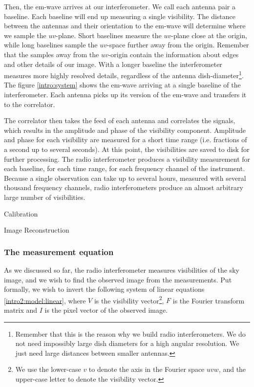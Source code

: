 Then, the em-wave arrives at our interferometer. We call each antenna pair a baseline. Each baseline will end up measuring a single visibility. The distance between the antennas and their orientation to the em-wave will determine where we sample the $uv$-plane. Short baselines measure the $uv$-plane close at the origin, while long baselines sample the $uv$-space further away from the origin. Remember that the samples away from the $uv$-origin contain the information about edges and other details of our image. With a longer baseline the interferometer measures more highly resolved details, regardless of the antenna dish-diameter\footnote{Remember that this is the reason why we build radio interferometers. We do not need impossibly large dish diameters for a high angular resolution. We just need large distances between smaller antennas.}. The figure \ref{intro:system} shows the em-wave arriving at a single baseline of the interferometer. Each antenna picks up its version of the em-wave and transfers it to the correlator.

The correlator then takes the feed of each antenna and correlates the signals, which results in the amplitude and phase of the visibility component. Amplitude and phase for each visibility are measured for a short time range (i.e. fractions of a second up to several seconds). At this point, the visibilities are saved to disk for further processing. The radio interferometer produces a visibility measurement for each baseline, for each time range, for each frequency channel of the instrument. Because a single observation can take up to several hours, measured with several thousand frequency channels, radio interferometers produce an almost arbitrary large number of visibilities.

Calibration

Image Reconstruction



\subsubsection{The measurement equation}
As we discussed so far, the radio interferometer measures visibilities of the sky image, and we wish to find the observed image from the measurements. Put formally, we wish to invert the following system of linear equations \eqref{intro2:model:linear}, where $V$ is the visibility vector\footnote{We use the lower-case $v$ to denote the axis in the Fourier space $uvw$, and the upper-case letter to denote the visibility vector.}, $F$ is the Fourier transform matrix and $I$ is the pixel vector of the observed image.

